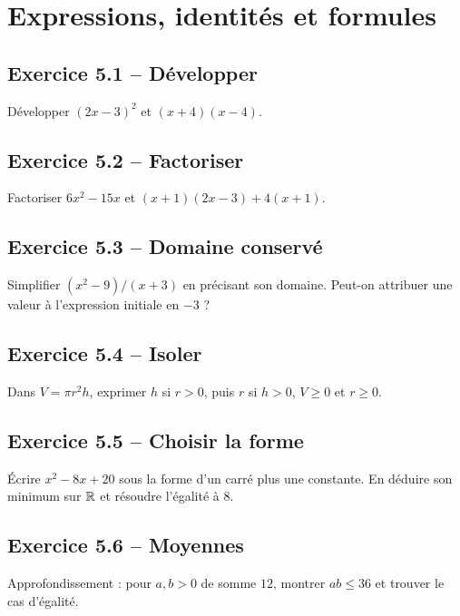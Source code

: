 \chapter{Expressions, identités et formules}
\section*{Exercice 5.1 -- Développer}
Développer $(2x-3)^2$ et $(x+4)(x-4)$.

\section*{Exercice 5.2 -- Factoriser}
Factoriser $6x^2-15x$ et $(x+1)(2x-3)+4(x+1)$.

\section*{Exercice 5.3 -- Domaine conservé}
Simplifier $(x^2-9)/(x+3)$ en précisant son domaine. Peut-on attribuer une valeur à l'expression initiale en $-3$ ?

\section*{Exercice 5.4 -- Isoler}
Dans $V=\pi r^2h$, exprimer $h$ si $r>0$, puis $r$ si $h>0$, $V\geq0$ et $r\geq0$.

\section*{Exercice 5.5 -- Choisir la forme}
Écrire $x^2-8x+20$ sous la forme d'un carré plus une constante. En déduire son minimum sur $\mathbb{R}$ et résoudre l'égalité à $8$.

\section*{Exercice 5.6 -- Moyennes}
Approfondissement : pour $a,b>0$ de somme $12$, montrer $ab\leq36$ et trouver le cas d'égalité.
